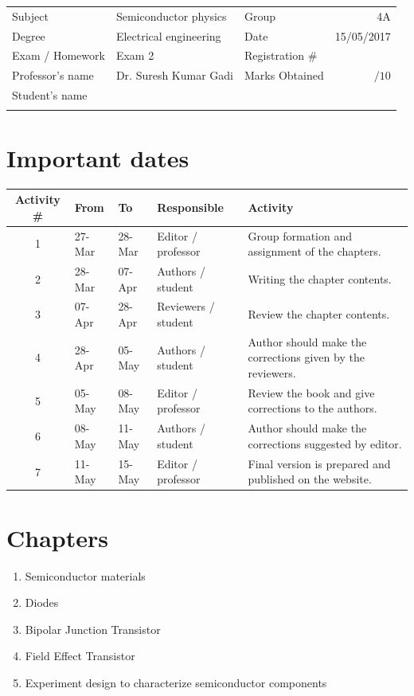 \documentclass{article}
\newcommand{\Subject}{Semiconductor physics}
\newcommand{\Group}{4A}
\newcommand{\Carrera}{Electrical engineering}
\newcommand{\ExamType}{Exam 2}
\newcommand{\Date}{15/05/2017}
\newcommand{\PName}{Dr. Suresh Kumar Gadi}
\begin{document}
{\begin{center}
\begin{tabularx}{\textwidth}{ ||>{\columncolor{Gray}}l|X||>{\columncolor{Gray}}l|r|| }
				\hhline{|t==:t:==t|}
				Subject      		& \Subject  		& Group         	& \Group   					\\ \hhline{|:==::==:|}
				Degree         		& \Carrera  		& Date      		& \Date     				\\ \hhline{|:==::==:|}
				Exam / Homework		& \ExamType    		& Registration \#	& \textbf{\textit{\No}}       				\\ \hhline{|:==::==:|}
				Professor's name	& \PName			& Marks Obtained	& \underline{\hspace{1cm}} $\Big /10$				\\ \hhline{|:==:b:==:|}
				Student's name		& \multicolumn{3}{X||}{\textbf{\textit{\MakeUppercase{\SName}}}}	\\ \hhline{|b====b|}
			\end{tabularx}
		\end{center}
		\section{Important dates}
		\begin{tabularx}{\textwidth}{|c|l|l|l|X|}
			\hline
			\textbf{Activity \#}	&	\textbf{From}	&	\textbf{To}	&	\textbf{Responsible}	&	\textbf{Activity}	\\ \hline
			1	&	27-Mar	&	28-Mar	&	Editor / professor	&	Group formation and assignment of the chapters.	\\ \hline
			2	&	28-Mar	&	07-Apr	&	Authors / student	&	Writing the chapter contents.	\\ \hline
			3	&	07-Apr	&	28-Apr	&	Reviewers / student	&	Review the chapter contents.	\\ \hline
			4	&	28-Apr	&	05-May	&	Authors / student	&	Author should make the corrections given by the reviewers.	\\ \hline
			5	&	05-May	&	08-May	&	Editor / professor	&	Review the book and give corrections to the authors. 	\\ \hline
			6	&	08-May	&	11-May	&	Authors / student	&	Author should make the corrections suggested by editor.	\\ \hline
			7	&	11-May	&	15-May	&	Editor / professor	&	Final version is prepared and published on the website. 	\\ \hline
		\end{tabularx}
		\section{Chapters}
		\begin{enumerate}
			\item Semiconductor materials
			\item Diodes
			\item Bipolar Junction Transistor
			\item Field Effect Transistor
			\item Experiment design to characterize semiconductor components
		\end{enumerate}
}
\end{document}
